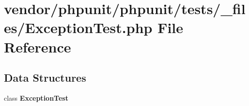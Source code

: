 \section{vendor/phpunit/phpunit/tests/\+\_\+files/\+Exception\+Test.php File Reference}
\label{phpunit_2phpunit_2tests_2__files_2_exception_test_8php}
\subsection*{Data Structures}
\begin{DoxyCompactItemize}
\item 
class {\bf Exception\+Test}
\end{DoxyCompactItemize}
